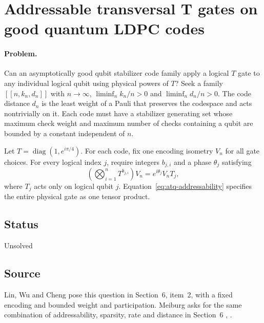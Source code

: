 \section{Addressable transversal T gates on good quantum LDPC codes}
\label{sec:op_f8345db004d2e958}

\paragraph{Problem.}
Can an asymptotically good qubit stabilizer code family apply a logical $T$ gate to any individual logical qubit using physical powers of $T$? Seek a family $[[n,k_n,d_n]]$ with $n\to\infty$, $\liminf_n k_n/n>0$ and $\liminf_n d_n/n>0$. The code distance $d_n$ is the least weight of a Pauli that preserves the codespace and acts nontrivially on it. Each code must have a stabilizer generating set whose maximum check weight and maximum number of checks containing a qubit are bounded by a constant independent of $n$.

Let $T=\operatorname{diag}(1,e^{i\pi/4})$. For each code, fix one encoding isometry $V_n$ for all gate choices. For every logical index $j$, require integers $b_{j,i}$ and a phase $\theta_j$ satisfying
\begin{equation}
\left(\bigotimes_{i=1}^n T^{b_{j,i}}\right)V_n
=e^{i\theta_j}V_nT_j,
\label{eq:atq-addressability}
\end{equation}
where $T_j$ acts only on logical qubit $j$. Equation~\eqref{eq:atq-addressability} specifies the entire physical gate as one tensor product.

\subsection*{Status}

Unsolved

\subsection*{Source}

Lin, Wu and Cheng pose this question in Section~6, item~2, with a fixed encoding and bounded weight and participation. Meiburg asks for the same combination of addressability, sparsity, rate and distance in Section~6 , .

